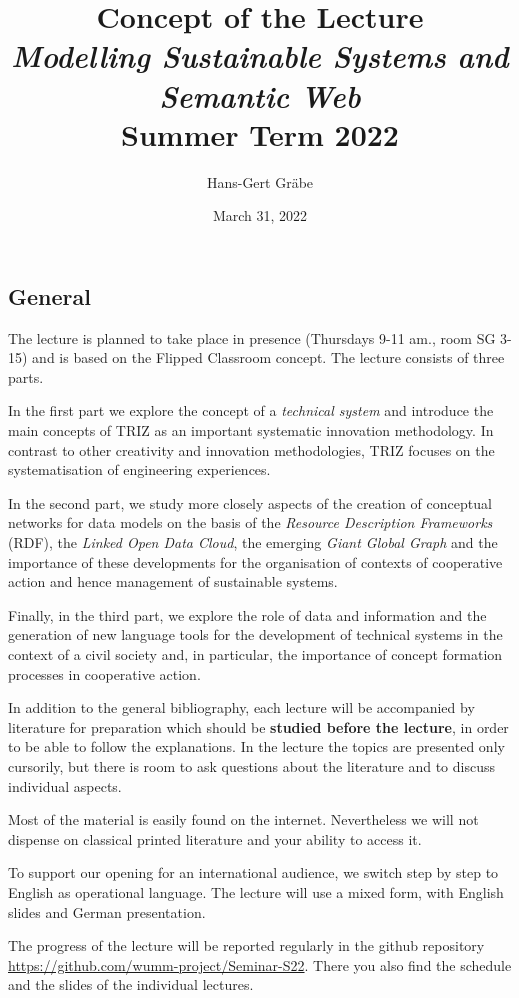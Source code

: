 \documentclass[11pt,a4paper]{article}
\title{Concept of the Lecture \\[1em] \emph{Modelling Sustainable Systems and
    Semantic Web} \\[1em] Summer Term 2022}
\author{Hans-Gert Gr\"abe}
\date{March 31, 2022}
\begin{document}
\maketitle

\subsection{General}

The lecture is planned to take place in presence (Thursdays 9-11 am., room SG
3-15) and is based on the Flipped Classroom concept. The lecture consists of
three parts.

In the first part we explore the concept of a \emph{technical system} and
introduce the main concepts of TRIZ as an important systematic innovation
methodology.  In contrast to other creativity and innovation methodologies,
TRIZ focuses on the systematisation of engineering experiences.

In the second part, we study more closely aspects of the creation of
conceptual networks for data models on the basis of the \emph{Resource
  Description Frameworks} (RDF), the \emph{Linked Open Data Cloud}, the
emerging \emph{Giant Global Graph} and the importance of these developments
for the organisation of contexts of cooperative action and hence management of
sustainable systems.

Finally, in the third part, we explore the role of data and information and
the generation of new language tools for the development of technical systems
in the context of a civil society and, in particular, the importance of
concept formation processes in cooperative action.

In addition to the general bibliography, each lecture will be accompanied by
literature for preparation which should be \textbf{studied before the
  lecture}, in order to be able to follow the explanations. In the lecture the
topics are presented only cursorily, but there is room to ask questions about
the literature and to discuss individual aspects.

Most of the material is easily found on the internet. Nevertheless we will not
dispense on classical printed literature and your ability to access it.

To support our opening for an international audience, we switch step by step
to English as operational language. The lecture will use a mixed form, with
English slides and German presentation.

The progress of the lecture will be reported regularly in the github
repository \url{https://github.com/wumm-project/Seminar-S22}. There you also
find the schedule and the slides of the individual lectures.
\end{document}
